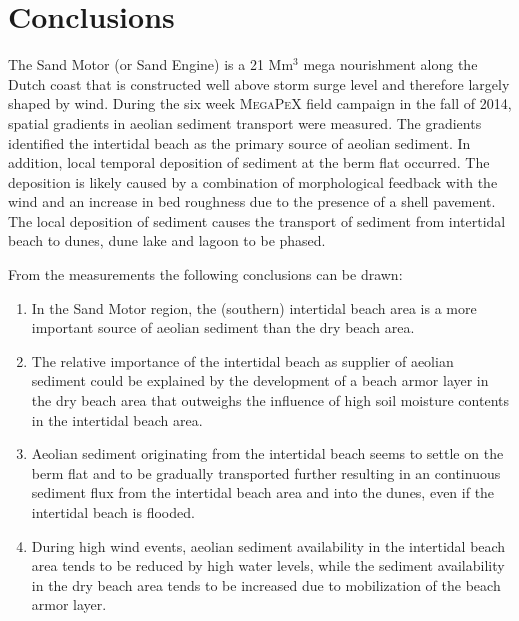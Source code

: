 \section{Conclusions}

The Sand Motor (or Sand Engine) is a 21 $\mathrm{Mm^3}$ mega
nourishment along the Dutch coast that is constructed well above storm
surge level \citep{Stive2013} and therefore largely shaped by
wind. During the six week \textsc{MegaPeX} field campaign in the fall
of 2014, spatial gradients in aeolian sediment transport were
measured. The gradients identified the intertidal beach as the primary
source of aeolian sediment. In addition, local temporal deposition of
sediment at the berm flat occurred. The deposition is likely caused by
a combination of morphological feedback with the wind and an increase
in bed roughness due to the presence of a shell pavement. The local
deposition of sediment causes the transport of sediment from
intertidal beach to dunes, dune lake and lagoon to be phased.

\bigskip

\noindent From the measurements the following conclusions can be drawn:

\begin{enumerate}
\item In the Sand Motor region, the (southern) intertidal beach area
  is a more important source of aeolian sediment than the dry beach
  area.
\item The relative importance of the intertidal beach as supplier of
  aeolian sediment could be explained by the development of a beach
  armor layer in the dry beach area that outweighs the influence of
  high soil moisture contents in the intertidal beach area.
\item Aeolian sediment originating from the intertidal beach seems to
  settle on the berm flat and to be gradually transported further
  resulting in an continuous sediment flux from the intertidal beach
  area and into the dunes, even if the intertidal beach is flooded.
\item During high wind events, aeolian sediment availability in the
  intertidal beach area tends to be reduced by high water levels,
  while the sediment availability in the dry beach area tends to be
  increased due to mobilization of the beach armor layer.
\end{enumerate}

